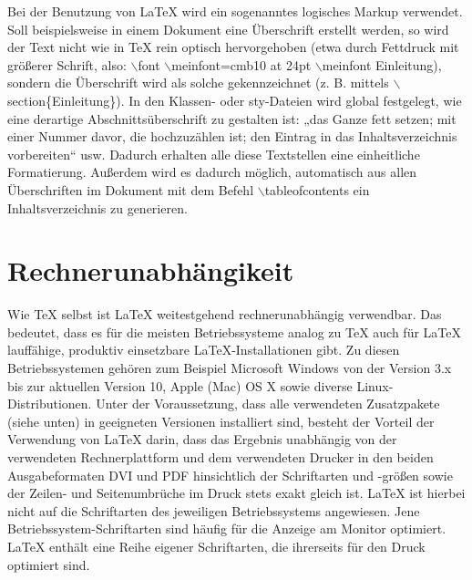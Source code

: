 Bei der Benutzung von LaTeX wird ein sogenanntes logisches Markup verwendet. Soll beispielsweise in einem Dokument eine Überschrift erstellt werden, so wird der Text nicht wie in TeX rein optisch hervorgehoben (etwa durch Fettdruck mit größerer Schrift, also: \colorbox{black!8}{$\backslash$font $\backslash$meinfont=cmb10 at 24pt $\backslash$meinfont Einleitung}), sondern die Überschrift wird als solche gekennzeichnet (z. B. mittels \colorbox{black!8}{$\backslash$section\{Einleitung\}}). In den Klassen- oder sty-Dateien wird global festgelegt, wie eine derartige Abschnittsüberschrift zu gestalten ist: „das Ganze fett setzen; mit einer Nummer davor, die hochzuzählen ist; den Eintrag in das Inhaltsverzeichnis vorbereiten“ usw. Dadurch erhalten alle diese Textstellen eine einheitliche Formatierung. Außerdem wird es dadurch möglich, automatisch aus allen Überschriften im Dokument mit dem Befehl \colorbox{black!8}{$\backslash$tableofcontents} ein Inhaltsverzeichnis zu generieren.

\section{Rechnerunabhängikeit}

Wie TeX selbst ist LaTeX weitestgehend rechnerunabhängig verwendbar. Das bedeutet, dass es für die meisten Betriebssysteme analog zu TeX auch für LaTeX lauffähige, produktiv einsetzbare LaTeX-Installationen gibt. Zu diesen Betriebssystemen gehören zum Beispiel Microsoft Windows von der Version 3.x bis zur aktuellen Version 10, Apple (Mac) OS X sowie diverse Linux-Distributionen. Unter der Voraussetzung, dass alle verwendeten Zusatzpakete (siehe unten) in geeigneten Versionen installiert sind, besteht der Vorteil der Verwendung von LaTeX darin, dass das Ergebnis unabhängig von der verwendeten Rechnerplattform und dem verwendeten Drucker in den beiden Ausgabeformaten DVI und PDF hinsichtlich der Schriftarten und -größen sowie der Zeilen- und Seitenumbrüche im Druck stets exakt gleich ist. LaTeX ist hierbei nicht auf die Schriftarten des jeweiligen Betriebssystems angewiesen. Jene Betriebssystem-Schriftarten sind häufig für die Anzeige am Monitor optimiert. LaTeX enthält eine Reihe eigener Schriftarten, die ihrerseits für den Druck optimiert sind.

